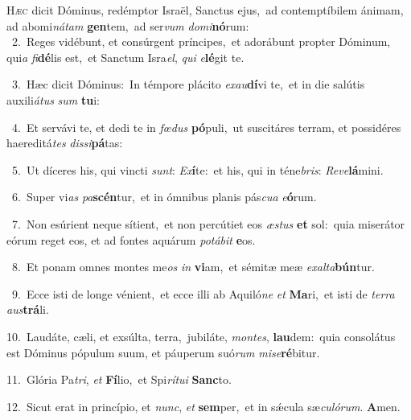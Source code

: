 \lettrine{\initial\textcolor{\initialcolor}{H}}{æc} dicit Dóminus, redémptor Israël, Sanctus ejus,~\dagger ad contemptíbilem ánimam, ad abomi\-\textit{ná}\-\textit{tam} \textbf{gen}\-tem,~\star ad ser\textit{vum} \textit{do}\-\textit{mi}\textbf{nó}rum:\\
{\numbfont\textcolor{\numbcolor}{~2.}}~Reges vidébunt, et consúrgent príncipes,~\dagger et adorábunt propter Dóminum, qui\textit{a} \textit{fi}\-\textbf{dé}lis est,~\star et Sanctum Isra\-\textit{el}\-, \textit{qui} \textit{e}\-\textbf{lé}git te.\par
{\numbfont\textcolor{\numbcolor}{~3.}}~Hæc dicit Dóminus:~\dagger In témpore plácito \textit{ex}\-\textit{au}\textbf{dí}vi te,~\star et in die salútis auxili\-\textit{á}\-\textit{tus} \textit{sum} \textbf{tu}\-i:\par
{\numbfont\textcolor{\numbcolor}{~4.}}~Et servávi te, et dedi te in \textit{fœ}\-\textit{dus} \textbf{pó}\-puli,~\star ut suscitáres terram, et possidéres haereditá\textit{tes} \textit{dis}\-\textit{si}\textbf{pá}tas:\par
{\numbfont\textcolor{\numbcolor}{~5.}}~Ut díceres his, qui vincti \textit{sunt}\-: \textit{Ex}\-\textbf{í}te:~\star et his, qui in téne\-\textit{bris}\-: \textit{Re}\-\textit{ve}\textbf{lá}mini.\par
{\numbfont\textcolor{\numbcolor}{~6.}}~Super vi\textit{as} \textit{pa}\-\textbf{scén}tur,~\star et in ómnibus planis pás\-\textit{cu}\-\textit{a} \textit{e}\-\textbf{ó}rum.\par
{\numbfont\textcolor{\numbcolor}{~7.}}~Non esúrient neque sítient,~\dagger et non percútiet eos \textit{æs}\-\textit{tus} \textbf{et} sol:~\star quia miserátor eórum reget eos, et ad fontes aquárum \textit{po}\-\textit{tá}\textit{bit} \textbf{e}\-os.\par
{\numbfont\textcolor{\numbcolor}{~8.}}~Et ponam omnes montes me\textit{os} \textit{in} \textbf{vi}\-am,~\star et sémitæ meæ \textit{ex}\-\textit{al}\textit{ta}\textbf{bún}tur.\par
{\numbfont\textcolor{\numbcolor}{~9.}}~Ecce isti de longe vénient,~\dagger et ecce illi ab Aquiló\textit{ne} \textit{et} \textbf{Ma}\-ri,~\star et isti de \textit{ter}\-\textit{ra} \textit{aus}\-\textbf{trá}li.\par
{\numbfont\textcolor{\numbcolor}{10.}}~Laudáte, cæli, et exsúlta, terra,~\dagger jubiláte, \textit{mon}\-\textit{tes}, \textbf{lau}\-dem:~\star quia consolátus est Dóminus pópulum suum, et páuperum suó\textit{rum} \textit{mi}\-\textit{se}\textbf{ré}bitur.\par
{\numbfont\textcolor{\numbcolor}{11.}}~Glória Pa\-\textit{tri}\-, \textit{et} \textbf{Fí}\-lio,~\star et Spi\-\textit{rí}\-\textit{tu}\textit{i} \textbf{Sanc}\-to.\par
{\numbfont\textcolor{\numbcolor}{12.}}~Sicut erat in princípio, et \textit{nunc}\-, \textit{et} \textbf{sem}\-per,~\star et in sǽcula sæ\-\textit{cu}\-\textit{ló}\textit{rum}. \textbf{A}\-men.\par
